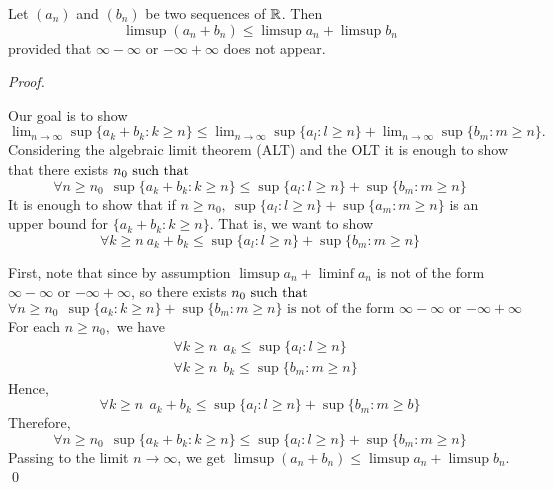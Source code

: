 \begin{theorem}
    Let $(a_n)$ and $(b_n)$ be two sequences of $\mathbb{R}$. Then 
    $$\limsup (a_n + b_n) \leq \limsup a_n + \limsup b_n$$
    provided that $\infty -\infty$ or $-\infty + \infty$ does not appear.
\end{theorem}

\begin{proof}\leavevmode \\
    \begin{info}
        Our goal is to show $\lim_{n\to \infty} \sup \{a_k + b_k : k \geq n\} \leq \lim_{n\to\infty} \sup \{a_l : l \geq n\} + \lim_{n\to\infty} \sup \{b_m : m \geq n\}.$ Considering the algebraic limit theorem (ALT) and the OLT it is enough to show that there exists $n_0 \text{ such that }$
        $$\forall n \geq n_0 ~~\sup\{a_k + b_k : k \geq n\} \leq \sup\{a_l : l \geq n\} + \sup\{b_m : m\geq n\}$$
        It is enough to show that if $n \geq n_0, ~\sup \{a_l : l \geq n\} + \sup \{a_m : m \geq n\}$ is an upper bound for $\{a_k + b_k : k \geq n\}.$ That is, we want to show
        $$\forall k \geq n ~a_k + b_k \leq \sup\{a_l : l\geq n\} + \sup\{b_m : m\geq n\}$$
    \end{info}

    First, note that since by assumption $\limsup a_n + \liminf a_n$ is not of the form $\infty - \infty$ or $-\infty + \infty$, so there exists $n_0 \text{ such that }$
    $$\forall n \geq n_0 ~~\sup\{a_k : k \geq n\} + \sup\{b_m : m\geq n\}\text{ is not of the form $\infty - \infty$ or $-\infty + \infty$}$$
    For each $n \geq n_0,$ we have
    \begin{align*}
        &\forall k \geq n ~~a_k \leq \sup\{a_l : l \geq n\} \\
        &\forall k \geq n ~~b_k \leq \sup\{b_m : m \geq n\}
    \end{align*}
    Hence,
    $$\forall k \geq n ~~a_k + b_k \leq \sup\{a_l : l \geq n\} + \sup\{b_m : m \geq b\}$$
    Therefore,
    $$\forall n \geq n_0 ~~\sup\{a_k + b_k : k \geq n\} \leq \sup\{a_l : l \geq n\} + \sup\{b_m : m \geq n\}$$
    Passing to the limit $n\to \infty$, we get $\limsup (a_n + b_n) \leq \limsup a_n + \limsup b_n$.
    \qed
\end{proof}

